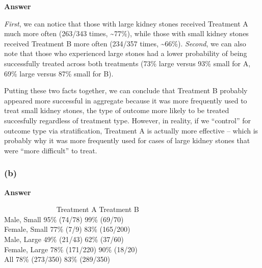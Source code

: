 \documentclass[
  11pt,
  letterpaper,
  DIV=11,
  numbers=noendperiod]{scrartcl}
\begin{document}
\begin{tcolorbox}[enhanced jigsaw, breakable, leftrule=.75mm, toprule=.15mm, arc=.35mm, bottomrule=.15mm, left=2mm, opacityback=0, colback=white, colframe=quarto-callout-note-color-frame, rightrule=.15mm]

\textbf{Answer}\vspace{2mm}

\emph{First}, we can notice that those with large kidney stones received
Treatment A much more often (263/343 times, \textasciitilde77\%), while
those with small kidney stones received Treatment B more often (234/357
times, \textasciitilde66\%). \emph{Second}, we can also note that those
who experienced large stones had a lower probability of being
successfully treated across both treatments (73\% large versus 93\%
small for A, 69\% large versus 87\% small for B).

Putting these two facts together, we can conclude that Treatment B
probably appeared more successful in aggregate because it was more
frequently used to treat small kidney stones, the type of outcome more
likely to be treated succesfully regardless of treatment type. However,
in reality, if we ``control'' for outcome type via stratification,
Treatment A is actually more effective -- which is probably why it was
more frequently used for cases of large kidney stones that were ``more
difficult'' to treat.

\end{tcolorbox}

\hypertarget{b-1}{%
\subsubsection{(b)}\label{b-1}}

\begin{tcolorbox}[enhanced jigsaw, breakable, leftrule=.75mm, toprule=.15mm, arc=.35mm, bottomrule=.15mm, left=2mm, opacityback=0, colback=white, colframe=quarto-callout-note-color-frame, rightrule=.15mm]

\textbf{Answer}\vspace{2mm}

~~~~~~~~~~~~~~\textbar{} Treatment A \textbar{} Treatment B \textbar{}\\
Male, Small \textbar{} 95\% (74/78) \textbar{} 99\% (69/70) \textbar{}\\
Female, Small \textbar{} 77\% (7/9) \textbar{} 83\% (165/200)
\textbar{}\\
Male, Large \textbar{} 49\% (21/43) \textbar{} 62\% (37/60) \textbar{}\\
Female, Large \textbar{} 78\% (171/220) \textbar{} 90\% (18/20)
\textbar{}\\
All \textbar{} 78\% (273/350) \textbar{} 83\% (289/350) \textbar{}

\end{tcolorbox}
\end{document}
